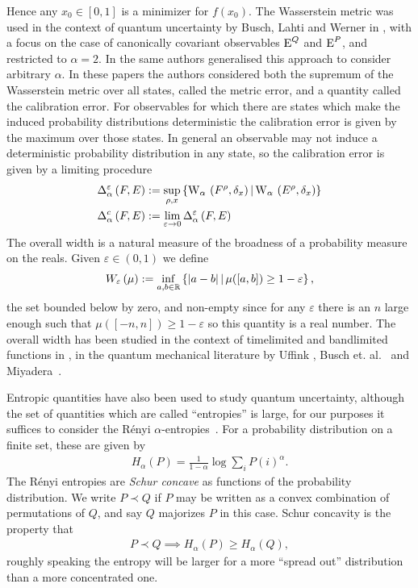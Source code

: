 Hence any $x_0\in [0,1]$ is a minimizer for $f(x_0)$. The Wasserstein metric was used in the context of quantum uncertainty by Busch, Lahti and Werner in \cite{PhysRevLett.111.160405}, with a focus on the case of canonically covariant observables $\operatorname{E}^Q$ and $\operatorname{E}^P$, and restricted to $\alpha=2$. In \cite{blw-meas-uncertainty} the same authors generalised this approach to consider arbitrary $\alpha$. In these papers the authors considered both the supremum of the Wasserstein metric over all states, called the metric error, and a quantity called the calibration error. For observables for which there are states which make the induced probability distributions deterministic the calibration error is given by the maximum over those states. In general an observable may not induce a deterministic probability distribution in any state, so the calibration error is given by a limiting procedure
\begin{align}
  \calibError{F}{E}{\alpha}[\varepsilon] &\defeq \sup_{\rho,x} \sbuild{\ws{F^\rho,\delta_{x}}[\alpha]}{\ws{E^\rho,\delta_{x}}[\alpha]}\\
  \calibError{F}{E}{\alpha} &\defeq \lim_{\varepsilon\to 0} \calibError{F}{E}{\alpha}[\varepsilon]  
\end{align}
The overall width is a natural measure of the broadness of a probability measure on the reals. Given $\varepsilon\in (0,1)$ we define
\begin{align}
  W_{\varepsilon}\left({\mu}\right) := \inf_{a,b\in\mathbb{R}} \left\{{\left\lvert{a-b}\right\rvert}\,\middle|\,\mu([a,b])\geq 1-\varepsilon\right\}, \label{eqn:overall-width-defn}
\end{align}
the set bounded below by zero, and non-empty since for any $\varepsilon$ there is an $n$ large enough such that $\mu([-n,n])\geq 1-\varepsilon$ so this quantity is a real number. The overall width has been studied in the context of timelimited and bandlimited functions in \cite{6773660}, in the quantum mechanical literature by Uffink \cite{ufink-thesis}, Busch et. al.~\cite{BUSCH2007155} and Miyadera~\cite{doi:10.1063/1.3614503}.

Entropic quantities have also been used to study quantum uncertainty, although the set of quantities which are called ``entropies'' is large, for our purposes it suffices to consider the R\'enyi $\alpha$-entropies~\cite{renyi1961}. For a probability distribution on a finite set, these are given by
\begin{align}
  H_\alpha(P) = \frac{1}{1-\alpha} \log{\sum_i P(i)^\alpha}.
\end{align}
The R{\'e}nyi entropies are \emph{Schur concave} as functions of the probability distribution. We write $P \prec Q$ if $P$ may be written as a convex combination of permutations of $Q$, and say $Q$ majorizes $P$ in this case. Schur concavity is the property that
\begin{align}
  P\prec Q \implies H_\alpha(P) \geq H_\alpha(Q),
\end{align}
roughly speaking the entropy will be larger for a more ``spread out'' distribution than a more concentrated one.

